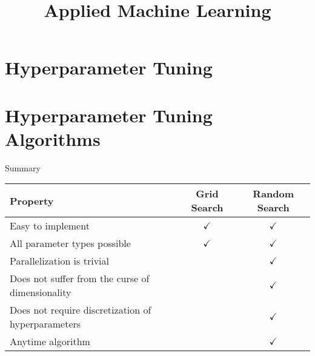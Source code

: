 \documentclass[11pt,compress,t,notes=noshow, xcolor=table]{beamer}
\title{Applied Machine Learning}
\date{}
\begin{document}


\section{Hyperparameter Tuning}



\section{Hyperparameter Tuning Algorithms}



\begin{frame}{Summary}
    \begin{table}[]
        \centering
        \begin{tabular}{l|cc}
            Property & Grid Search & Random Search \\
            \midrule
            Easy to implement & $\checkmark$ & $\checkmark$ \\
            All parameter types possible & $\checkmark$ & $\checkmark$ \\
            Parallelization is trivial & & $\checkmark$ \\
            Does not suffer from the curse of dimensionality & & $\checkmark$ \\
            Does not require discretization of hyperparameters & & $\checkmark$ \\
            Anytime algorithm & & $\checkmark$
        \end{tabular}
    \end{table}
\end{frame}





\endlecture
\end{document}
